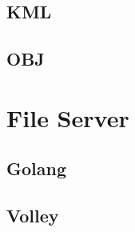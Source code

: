 \subsection{KML}

\subsection{OBJ}

\section{File Server}

\subsection{Golang}

\subsection{Volley}

